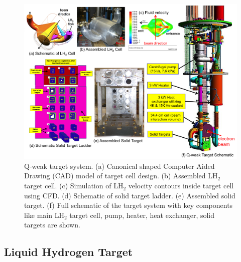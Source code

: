 \begin{singlespace}
\begin{figure}[!h]
	\begin{center}
	\includegraphics[width=15cm]{figures/target}
	\caption
	{Q-weak target system. (a) Canonical shaped Computer Aided Drawing (CAD) model of target cell design. (b) Assembled LH$_{2}$ target cell. (c) Simulation of LH$_{2}$ velocity contours inside target cell using CFD. (d) Schematic of solid target ladder. (e) Assembled solid target. (f) Full schematic of the target system with key components like main LH$_{2}$ target cell, pump, heater, heat exchanger, solid targets are shown. }
	\label{fig:target}
	\end{center}
\end{figure}
\end{singlespace}
%


\subsection{Liquid Hydrogen Target}%
\label{Liquid Hydrogen Target}

